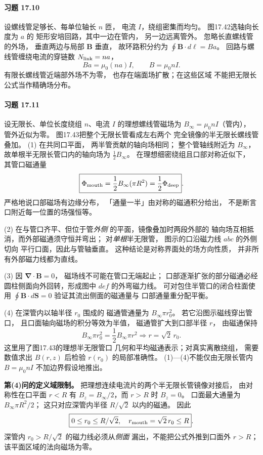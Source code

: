 \paragraph{习题 17.10}
设螺线管足够长、每单位轴长 \(n\) 匝，
电流 \(I\)，绕组密集而均匀。
图17.42选轴向长度为 \(a\) 的
矩形安培回路，其中一边在管内，
另一边远离管外。
忽略长直螺线管的外场，
垂直两边与局部 \(\boldsymbol B\) 垂直，
故环路积分约为
\(\oint\boldsymbol B\cdot d\boldsymbol\ell=Ba\)。
回路与螺线管缠绕电流的穿链数
\(N_{\rm link}=na\)，
\[
 Ba=\mu_0(na)I,
 \qquad \boxed{B=\mu_0nI}.
\]
有限长螺线管近端部外场不为零，
也存在端面场扩散；在这些区域
不能把无限长公式当作精确场分布。


\paragraph{习题 17.11}
设无限长、单位长度绕组 \(n\)、电流 \(I\)
的理想螺线管磁场为
\(B_\infty=\mu_0nI\)（管内），
管外近似为零。
图17.43把整个无限长管看成左右两个
完全镜像的半无限长螺线管叠加。
(1) 在共同口平面，
两半管贡献的轴向场相同；
整个管轴线附近为 \(B_\infty\)，
故单根半无限长管口内的轴向场为
\(\tfrac12 B_\infty\)。
在理想细密绕组且口部对称近似下，
其管口磁通量
\[
 \boxed{\Phi_{\rm mouth}
 =\frac12B_\infty(\pi R^2)
 =\frac12\Phi_{\rm deep}}.
\]
严格地说口部磁场有边缘分布，
「通量一半」由对称的磁通积分给出，
不是断言口附近每一位置的场强恒等。

(2) 在与管口齐平、但位于管\emph{外侧}
的平面，镜像叠加时两段外部的
轴向场互相抵消，而外部磁通须守恒并弯出；
对\emph{单根}半无限管，
图示的口沿磁力线 \(abc\) 的外侧切向
平行口面，因此与管轴垂直。
这种结论是对称界面处的场方向性质，
并非所有外部磁力线都为直线。

(3) 因
\(\boldsymbol\nabla\cdot\boldsymbol B=0\)，
磁场线不可能在管口无端起止；
口部逐渐扩张的部分磁通必经
圆柱侧面向外回转，形成图中
\(def\) 的外弯磁力线。
可对包住半管口的闭合柱面使用
\(\oint\boldsymbol B\cdot d\boldsymbol S=0\)
验证其流出侧面的磁通量与
口部通量重分配平衡。

(4) 在深管内以轴半径 \(r_0\) 围成的
磁通管通量为 \(B_\infty\pi r_0^2\)。
若它沿图示磁线穿出管口，
且口面轴向磁场的积分等效为半值，
磁通管扩大到口部半径 \(r\)，
由磁通保持
\[
 B_\infty\pi r_0^2
 =\frac12B_\infty\pi r^2
 \Longrightarrow
 \boxed{r=\sqrt2\,r_0}.
\]
这里用了图17.43的理想半无限管口
几何和平均磁通表示；对真实离散绕组，
需要数值求出 \(B(r,z)\) 后检验
\(r(r_0)\) 的局部准确性。
(1)—(4)不能仅由无限长管内
\(B=\mu_0nI\) 不加边界假设地推出。

\textbf{第(4)问的定义域限制。}
把理想连续电流片的两个半无限长管镜像对接后，
由对称性在口平面 \(r<R\) 有
\(B_z=B_\infty/2\)，而 \(r>R\) 时 \(B_z=0\)。
口面最大通量为 \(B_\infty\pi R^2/2\)；
这只对应深管内半径 \(R/\sqrt2\) 以内的磁通。
因此
\[
 \boxed{0\le r_0\le R/\sqrt2,\quad
 r_{\rm mouth}=\sqrt2\,r_0\le R}.
\]
深管内 \(r_0>R/\sqrt2\) 的磁力线必须从\emph{侧面}
漏出，不能把公式外推到口面外 \(r>R\)；
该平面区域的法向磁场为零。


